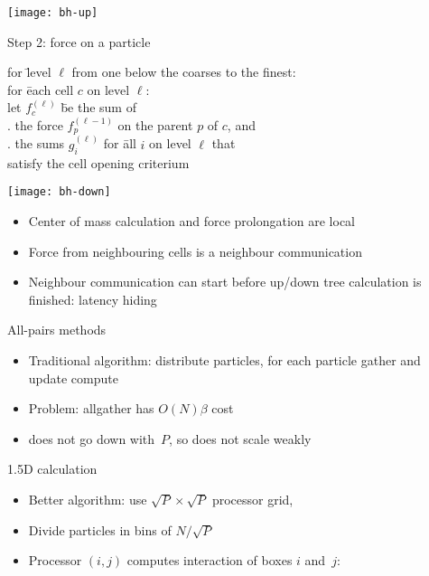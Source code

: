 \begin{frame}
  \texttt{[image: bh-up]}
\end{frame}

\begin{frame}{Step 2: force on a particle}
  \begin{tabbing}
    for \=level $\ell$ from one below the coarses to the finest:\\
    \>for \=each cell $c$ on level $\ell$:\\
    \>\>let $f^{(\ell)}_c$ \=be the sum of\\
    \>\>. the force $f^{(\ell-1)}_p$ on the parent $p$ of $c$, and\\
    \>\>. the sums $g^{(\ell)}_i$ for \=all $i$ on level $\ell$ that\\
    \>\>\>\>satisfy the cell opening criterium
  \end{tabbing}
\end{frame}

\begin{frame}
  \texttt{[image: bh-down]}
\end{frame}

\begin{frame}
  \begin{itemize}
  \item Center of mass calculation and force prolongation are local
  \item Force from neighbouring cells is a neighbour communication
  \item Neighbour communication can start before up/down tree
    calculation is finished: latency hiding
  \end{itemize}
\end{frame}

\begin{frame}{All-pairs methods}
  \begin{itemize}
  \item Traditional algorithm: distribute particles,
    for each particle gather and update compute
  \item Problem: allgather has $O(N)\beta$ cost
  \item does not go down with~$P$, so does not scale weakly
  \end{itemize}
\end{frame}

\begin{frame}{1.5D calculation}
  \begin{itemize}
  \item Better algorithm: use $\sqrt P\times\sqrt P$ processor grid,
  \item Divide particles in bins of $N/\sqrt P$
  \item Processor $(i,j)$ computes interaction of boxes $i$ and~$j$:
  \end{itemize}
\end{frame}

